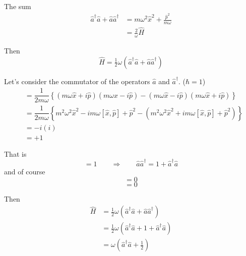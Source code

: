 \documentclass{article}
\begin{document}
\noindent The sum
\begin{align*}
\hat{a}^\dagger \hat{a} + \hat{a} \hat{a}^\dagger &= m \omega^2 \hat{x}^2 + \frac{\hat{p}^2}{ m \omega } \\
&= \tfrac{2}{\omega} \hat{H}
\end{align*}

\noindent Then
\begin{equation*}
\hat{H} = \tfrac{1}{2} \omega ( \hat{a}^\dagger \hat{a} + \hat{a} \hat{a}^\dagger )
\end{equation*}


\noindent Let's consider the commutator of the operators $\hat{a}$ and $\hat{a}^\dagger$. ($\hbar = 1$)
\begin{align*}
[ \hat{a}, \hat{a}^\dagger ] &= \dfrac{1}{2 m \omega} \left\lbrace ( m \omega \hat{x} + i \hat{p} ) ( m \omega \hat{x} - i \hat{p} ) - ( m \omega \hat{x} - i \hat{p} ) ( m \omega \hat{x} + i \hat{p} ) \right\rbrace \\
&= \dfrac{1}{2 m \omega} \left\lbrace m^2 \omega^2 \hat{x}^2 - i m \omega [ \hat{x}, \hat{p} ] + \hat{p}^2 - ( m^2 \omega^2 \hat{x}^2 + i m \omega [ \hat{x}, \hat{p} ] + \hat{p}^2 ) \right\rbrace \\
&= -i ( i ) \nonumber\\
&= +1
\end{align*}

\noindent That is
\begin{equation*}
[ \hat{a}, \hat{a}^\dagger ] = 1 \qquad \Rightarrow \qquad \hat{a} \hat{a}^\dagger = 1 + \hat{a}^\dagger \hat{a}
\end{equation*}
and of course
\begin{equation*}
[ \hat{a}, \hat{a} ] = 0
\end{equation*}
\begin{equation*}
[ \hat{a}^\dagger, \hat{a}^\dagger ] = 0
\end{equation*}

\noindent Then
\begin{align*}
\hat{H} &= \tfrac{1}{2} \omega ( \hat{a}^\dagger \hat{a} + \hat{a} \hat{a}^\dagger ) \\
&= \tfrac{1}{2} \omega ( \hat{a}^\dagger \hat{a} + 1 + \hat{a}^\dagger \hat{a} ) \\
&= \omega ( \hat{a}^\dagger \hat{a} + \tfrac{1}{2} )
\end{align*}

\end{document}
